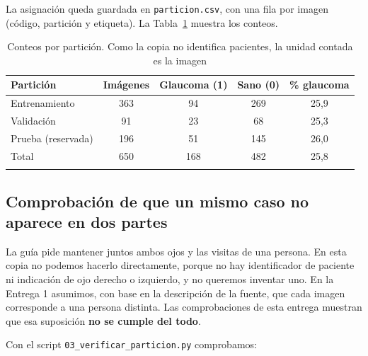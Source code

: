 \documentclass[pdflatex,sn-mathphys-num]{sn-jnl}%
\theoremstyle{thmstyleone}%
\theoremstyle{thmstyletwo}%
\theoremstyle{thmstylethree}%
\begin{document}
La asignación queda guardada en \texttt{particion.csv}, con una fila por imagen (código, partición y etiqueta). La Tabla~\ref{tab:particion} muestra los conteos.

\begin{table}[htbp]
\caption{Conteos por partición. Como la copia no identifica pacientes, la unidad contada es la imagen}\label{tab:particion}
\begin{tabular*}{\textwidth}{@{\extracolsep\fill}lcccc}
\toprule
Partición & Imágenes & Glaucoma (1) & Sano (0) & \% glaucoma \\
\midrule
Entrenamiento & 363 & 94 & 269 & 25,9 \\
Validación    & 91  & 23 & 68  & 25,3 \\
Prueba (reservada) & 196 & 51 & 145 & 26,0 \\
\midrule
Total & 650 & 168 & 482 & 25,8 \\
\botrule
\end{tabular*}
\end{table}

\subsection*{Comprobación de que un mismo caso no aparece en dos partes}

La guía pide mantener juntos ambos ojos y las visitas de una persona. En esta copia no podemos hacerlo directamente, porque no hay identificador de paciente ni indicación de ojo derecho o izquierdo, y no queremos inventar uno. En la Entrega 1 asumimos, con base en la descripción de la fuente, que cada imagen corresponde a una persona distinta. Las comprobaciones de esta entrega muestran que esa suposición \textbf{no se cumple del todo}.

Con el script \texttt{03\_verificar\_particion.py} comprobamos:
\end{document}
